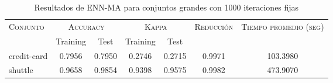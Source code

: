 \begin{table}[]
\centering
\begin{tabular}{l c c c c c c}
\hline
\multirow{2}{*}{\textsc{Conjunto}}
	& \multicolumn{2}{c}{\textsc{Accuracy}}
	& \multicolumn{2}{c}{\textsc{Kappa}}
	& \textsc{Reducción}
	& \textsc{Tiempo promedio (seg)} \\
	& Training & Test
	& Training & Test \\ 
\hline
\hline

credit-card & 0.7956 & 0.7950 & 0.2746 & 0.2715 & 0.9971 & 103.3980 \\
shuttle & 0.9658 & 0.9854 & 0.9398 & 0.9575 & 0.9982 & 473.9070 \\

\hline
\end{tabular}
\caption{Resultados de ENN-MA para conjuntos grandes con 1000 iteraciones fijas}
\label{res-grande-ENN-MA}
\end{table}

